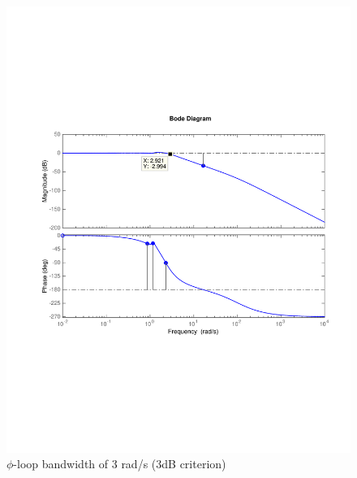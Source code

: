 \documentclass[12pt]{article}
\begin{document}
\begin{figure}[h!]
\begin{center}
\includegraphics[width=1\textwidth]{figures/phi_delta_a_closed_loop}
\caption{$\phi$-loop bandwidth of 3 rad/s (3dB criterion)}
\end{center}
\end{figure}
\end{document}
